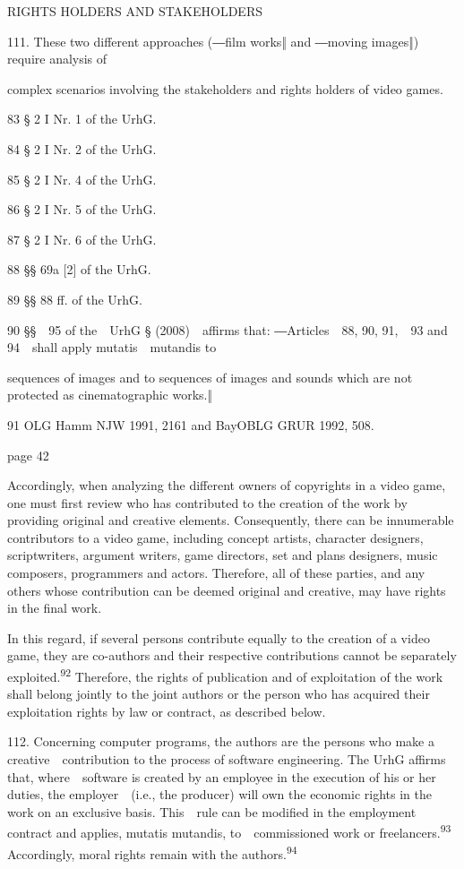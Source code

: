 \documentclass[
]{article}
\begin{document}
{RIGHTS HOLDERS AND STAKEHOLDERS}

{111. }{These two different approaches (―}{film works}{‖ and ―}{moving
images}{‖) require analysis of}

{complex scenarios involving the stakeholders and rights holders of
video games.}

{83 }{§ 2 I Nr. 1 of the }{UrhG}{.}

{84 }{§ 2 I Nr. 2 of the }{UrhG}{.}

{85 }{§ 2 I Nr. 4 of the }{UrhG}{.}

{86 }{§ 2 I Nr. 5 of the }{UrhG}{.}

{87 }{§ 2 I Nr. 6 of the }{UrhG}{.}

{88 }{§§ 69a {[}2{]} of the }{UrhG}{.}

{89 }{§§ 88 ff. of the }{UrhG}{.}

{90 }{§§~~95 of the~~}{UrhG }{§ (2008)~~affirms that: }{―}{Articles~~88,
90, 91,~~93 and 94~~shall apply }{mutatis~~mutandis }{to}

{sequences of images and to sequences of images and sounds which are not
protected as cinematographic works.}{‖}

{91 }{OLG Hamm NJW 1991, 2161 and BayOBLG GRUR 1992, 508.}

{page 42}

{Accordingly, when analyzing the different owners of copyrights in a
video game, one must first review who has contributed to the creation of
the work by providing original and creative elements. Consequently,
there can be innumerable contributors to a video game, including concept
artists, character designers, scriptwriters, argument writers, game
directors, set and plans designers, music composers, programmers and
actors. Therefore, all of these parties, and any others whose
contribution can be deemed original and creative, may have rights in the
final work.}

{In this regard, if several persons contribute equally to the creation
of a video game, they are co-authors and their respective contributions
cannot be separately exploited.}\textsuperscript{{92 }}{Therefore, the
rights of publication and of exploitation of the work shall belong
jointly to the joint authors or the person who has acquired their
exploitation rights by law or contract, as described below.}

{112. }{Concerning computer programs, the authors are the persons who
make a creative~~contribution to the process of software engineering.
The }{UrhG }{affirms that, where~~software is created by an employee in
the execution of his or her duties, the employer~~(i.e., the producer)
will own the economic rights in the work on an exclusive basis.
This~~rule can be modified in the employment contract and applies,
}{mutatis mutandis, }{to~~commissioned work or
freelancers.}\textsuperscript{{93 }}{Accordingly, moral rights remain
with the authors.}\textsuperscript{{94}}
\end{document}
